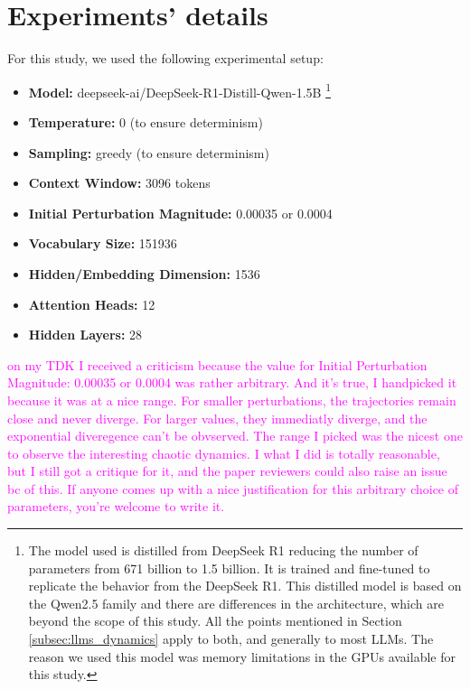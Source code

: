 \documentclass[aip%
 aip,
 amsmath,amssymb,
 reprint,%
]{revtex4-1}
\newcommand{\orange}[1]{\textcolor{orange}{#1}}
\newcommand{\mage}[1]{\textcolor{magenta}{#1}}
\begin{document}

\section{Experiments' details}
\label{sec:experiments}

For this study, we used the following experimental setup:
\begin{itemize}
    \item \textbf{Model:} deepseek-ai/DeepSeek-R1-Distill-Qwen-1.5B \cite{deepseek2025r1distillqwen1.5b} \footnote{The model used is distilled from DeepSeek R1 reducing the number of parameters from 671 billion to 1.5 billion. It is trained and fine-tuned to replicate the behavior from the DeepSeek R1. This distilled model is based on the Qwen2.5 family and there are differences in the architecture, which are beyond the scope of this study. All the points mentioned in Section \ref{subsec:llms_dynamics} apply to both, and generally to most LLMs. The reason we used this model was memory limitations in the GPUs available for this study.}
    \item \textbf{Temperature:} 0 (to ensure determinism)
    \item \textbf{Sampling:} greedy (to ensure determinism)
    \item \textbf{Context Window:} 3096 tokens
    \item \textbf{Initial Perturbation Magnitude:} 0.00035 or 0.0004 
    \item \textbf{Vocabulary Size:} 151936
    \item \textbf{Hidden/Embedding Dimension:} 1536
    \item \textbf{Attention Heads:} 12
    \item \textbf{Hidden Layers:} 28
\end{itemize}

\mage{on my TDK I received a criticism because the value for Initial Perturbation Magnitude: 0.00035 or 0.0004 was rather arbitrary. And it's true, I handpicked it because it was at a nice range. For smaller perturbations, the trajectories remain close and never diverge. For larger values, they immediatly diverge, and the exponential diveregence can't be obvserved. The range I picked was the nicest one to observe the interesting chaotic dynamics. I what I did is totally reasonable, but I still got a critique for it, and the paper reviewers could also raise an issue bc of this. If anyone comes up with a nice justification for this arbitrary choice of parameters, you're welcome to write it.}
\end{document}
